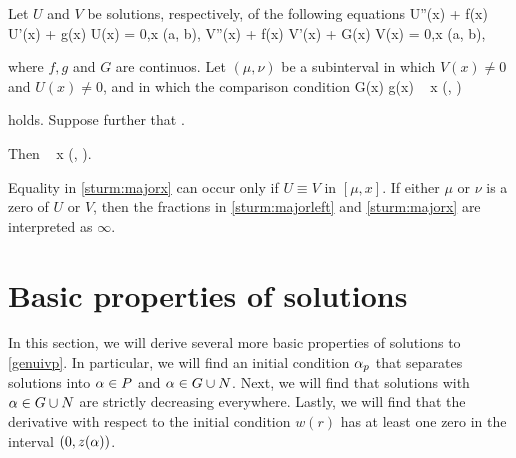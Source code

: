 \begin{theorem}
    Let $U$ and $V$ be solutions, respectively, of the following equations
    \be \label{sturm:uivp}
        U''(x) + f(x) U'(x) + g(x) U(x) = 0,\quad x \in (a, b),
    \ee
    \be \label{sturm:vivp}
        V''(x) + f(x) V'(x) + G(x) V(x) = 0,\quad x \in (a, b),
    \ee
    
    where $f, g$ and $G$ are continuos. Let $(\mu, \nu)$ be a subinterval in
    which $V(x) \neq 0$ and $U(x) \neq 0$, and in which the comparison condition 
    \be \label{sturm:compare}
        G(x) \geq g(x) \quad {} ~ x \in (\mu, \nu)
    \ee
    
    holds. Suppose further that
    \be \label{sturm:majorleft}
         \leq {}.
    \ee

    Then
    \be \label{sturm:majorx}
         \leq {}\quad {} ~ x \in
        (\mu, \nu).
    \ee

    Equality in \eqref{sturm:majorx} can occur only if $U \equiv V$ in $[\mu,
    x]$. If either $\mu$ or $\nu$ is a zero of $U$ or $V$, then the fractions in
    \eqref{sturm:majorleft} and \eqref{sturm:majorx} are interpreted as
    $\infty$. 

\end{theorem}

\begin{comment}
{\red In the end, we wish to show that the function $\za$ is monotone decreasing in
$\a$. Or actually, that $(\a, \a+\e)\subset N$ and if $\bar{\a}\in N$ then $\za :
[\bar{\a}, \infty)\to(0,\infty)$ is monotone decreasing.}
\end{comment}


\section{Basic properties of solutions}
In this section, we will derive several more basic properties of solutions to
\eqref{genuivp}. In particular, we will find an initial condition $\alpha_p$ that
separates solutions into $\alpha \in P$ and $\alpha \in G \cup N$. Next, we will find
that solutions with $\alpha \in G \cup N$ are strictly decreasing everywhere.
Lastly, we will find that the derivative with respect to the initial condition
$w(r)$ has at least one zero in the interval $(0, z(\alpha))$. 

